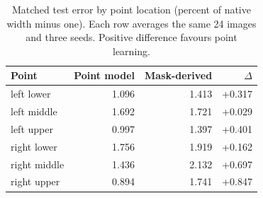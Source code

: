 \begin{table}[t]
\caption{Matched test error by point location (percent of native width minus one). Each row averages the same 24 images and three seeds. Positive difference favours point learning.}
\label{tab:boundary_detail}
\centering\small
\setlength{\tabcolsep}{3pt}
\begin{tabular}{lrrr}
\toprule
Point & Point model & Mask-derived & $\Delta$\\
\midrule
left lower & 1.096 & 1.413 & +0.317\\
left middle & 1.692 & 1.721 & +0.029\\
left upper & 0.997 & 1.397 & +0.401\\
right lower & 1.756 & 1.919 & +0.162\\
right middle & 1.436 & 2.132 & +0.697\\
right upper & 0.894 & 1.741 & +0.847\\
\bottomrule
\end{tabular}
\end{table}
